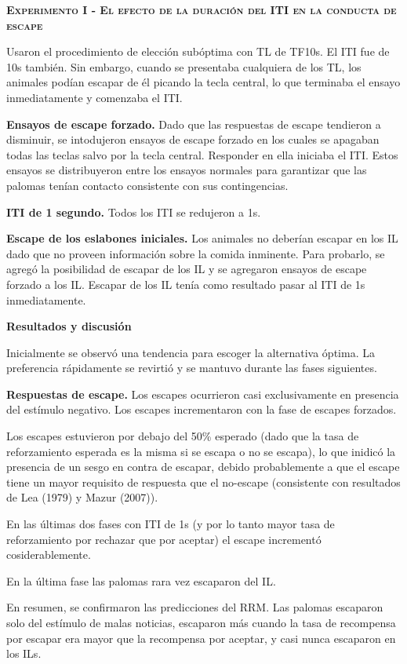 \documentclass[a4paper,12pt]{article}
\begin{document}
{\scshape\bfseries Experimento I - El efecto de la duración del ITI en la conducta de escape}

Usaron el procedimiento de elección subóptima con TL de TF10s. El ITI fue de 10s también. Sin embargo, cuando se presentaba cualquiera de los TL, los animales podían escapar de él picando la tecla central, lo que terminaba el ensayo inmediatamente y comenzaba el ITI.

{\bfseries Ensayos de escape forzado.} Dado que las respuestas de escape tendieron a disminuir, se intodujeron ensayos de escape forzado en los cuales se apagaban todas las teclas salvo por la tecla central. Responder en ella iniciaba el ITI. Estos ensayos se distribuyeron entre los ensayos normales para garantizar que las palomas tenían contacto consistente con sus contingencias.

{\bfseries ITI de 1 segundo.} Todos los ITI se redujeron a 1s.

{\bfseries Escape de los eslabones iniciales.} Los animales no deberían escapar en los IL dado que no proveen información sobre la comida inminente. Para probarlo, se agregó la posibilidad de escapar de los IL y se agregaron ensayos de escape forzado a los IL. Escapar de los IL tenía como resultado pasar al ITI de 1s inmediatamente.

{\bfseries Resultados y discusión}

Inicialmente se observó una tendencia para escoger la alternativa óptima. La preferencia rápidamente se revirtió y se mantuvo durante las fases siguientes.

{\bfseries Respuestas de escape.} Los escapes ocurrieron casi exclusivamente en presencia del estímulo negativo. Los escapes incrementaron con la fase de escapes forzados.

Los escapes estuvieron por debajo del 50\% esperado (dado que la tasa de reforzamiento esperada es la misma si se escapa o no se escapa), lo que inidicó la presencia de un sesgo en contra de escapar, debido probablemente a que el escape tiene un mayor requisito de respuesta que el no-escape (consistente con resultados de Lea (1979) y Mazur (2007)).

En las últimas dos fases con ITI de 1s (y por lo tanto mayor tasa de reforzamiento por rechazar que por aceptar) el escape incrementó cosiderablemente.

En la última fase las palomas rara vez escaparon del IL.

En resumen, se confirmaron las predicciones del RRM. Las palomas escaparon solo del estímulo de malas noticias, escaparon más cuando la tasa de recompensa por escapar era mayor que la recompensa por aceptar, y casi nunca escaparon en los ILs.
\end{document}
